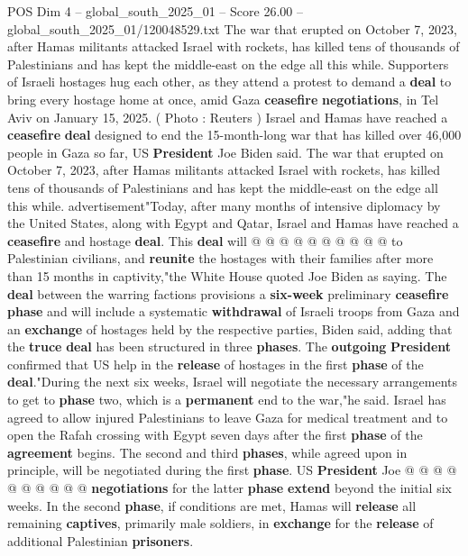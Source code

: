 \begin{textsample}{POS Dim 4 – global\_south\_2025\_01 – Score 26.00 – global\_south\_2025\_01/120048529.txt}  \label{ex:f4_pos_018}
The war that erupted on October 7, 2023, after Hamas militants attacked Israel with rockets, has killed tens of thousands of Palestinians and has kept the middle-east on the edge all this while.
Supporters of Israeli hostages hug each other, as they attend a protest to demand a \textbf{deal} to bring every hostage home at once, amid Gaza \textbf{ceasefire} \textbf{negotiations}, in Tel Aviv on January 15, 2025. ( Photo : Reuters ) Israel and Hamas have reached a \textbf{ceasefire} \textbf{deal} designed to end the 15-month-long war that has killed over 46,000 people in Gaza so far, US \textbf{President} Joe Biden said.
The war that erupted on October 7, 2023, after Hamas militants attacked Israel with rockets, has killed tens of thousands of Palestinians and has kept the middle-east on the edge all this while. advertisement"Today, after many months of intensive diplomacy by the United States, along with Egypt and Qatar, Israel and Hamas have reached a \textbf{ceasefire} and hostage \textbf{deal}.
This \textbf{deal} will @ @ @ @ @ @ @ @ @ @ to Palestinian civilians, and \textbf{reunite} the hostages with their families after more than 15 months in captivity,"the White House quoted Joe Biden as saying.
The \textbf{deal} between the warring factions provisions a \textbf{six-week} preliminary \textbf{ceasefire} \textbf{phase} and will include a systematic \textbf{withdrawal} of Israeli troops from Gaza and an \textbf{exchange} of hostages held by the respective parties, Biden said, adding that the \textbf{truce} \textbf{deal} has been structured in three \textbf{phases}.
The \textbf{outgoing} \textbf{President} confirmed that US help in the \textbf{release} of hostages in the first \textbf{phase} of the \textbf{deal}."During the next six weeks, Israel will negotiate the necessary arrangements to get to \textbf{phase} two, which is a \textbf{permanent} end to the war,"he said.
Israel has agreed to allow injured Palestinians to leave Gaza for medical treatment and to open the Rafah crossing with Egypt seven days after the first \textbf{phase} of the \textbf{agreement} begins.
The second and third \textbf{phases}, while agreed upon in principle, will be negotiated during the first \textbf{phase}.
US \textbf{President} Joe @ @ @ @ @ @ @ @ @ @ \textbf{negotiations} for the latter \textbf{phase} \textbf{extend} beyond the initial six weeks.
In the second \textbf{phase}, if conditions are met, Hamas will \textbf{release} all remaining \textbf{captives}, primarily male soldiers, in \textbf{exchange} for the \textbf{release} of additional Palestinian \textbf{prisoners}.

\end{textsample}

